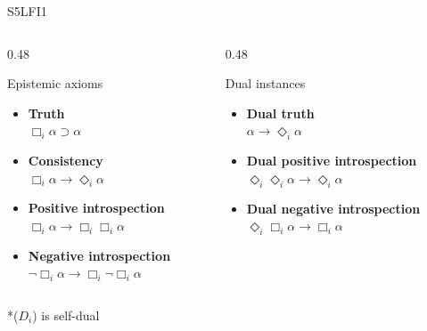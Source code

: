 \documentclass[aspectratio=169,11pt]{beamer}
\begin{document}
\begin{frame}{S5LFI1}
\vspace{-1.1cm}
\small\begin{columns}[T,onlytextwidth]

  \begin{column}{0.48\textwidth}
    \begin{block}{Epistemic axioms}
      \begin{itemize}
        \setlength{\itemsep}{0.8ex}

        \item[\(\mathbf{T}_i\)] \textbf{Truth}\\
          \(\Box_i\alpha \supset \alpha\)

        \item[\(\mathbf{D}_i\)] \textbf{Consistency}\\
          \(\Box_i\alpha \rightarrow \Diamond_i\alpha\)

        \item[\(\mathbf{4}_i\)] \textbf{Positive introspection}\\
          \(\Box_i\alpha \rightarrow \Box_i \Box_i\alpha\)

        \item[\(\mathbf{5}_i\)] \textbf{Negative introspection}\\
          \(\neg \Box_i\alpha \rightarrow \Box_i\neg \Box_i\alpha\)
      \end{itemize}
    \end{block}
  \end{column}

  \begin{column}{0.48\textwidth}
    \begin{block}{Dual instances}
      \begin{itemize}
        \setlength{\itemsep}{0.8ex}

        \item[\(\mathbf{T}'_i\)] \textbf{Dual truth}\\
          \(\alpha \rightarrow \Diamond_i\alpha\)

       
          

        \item[\(\mathbf{4}'_i\)] \textbf{Dual positive introspection}\\
          \(\Diamond_i\Diamond_i\alpha \rightarrow \Diamond_i\alpha\)

        \item[\(\mathbf{5}'_i\)] \textbf{Dual negative introspection}\\
          \(\Diamond_i\Box_i\alpha \rightarrow \Box_i\alpha\)
      \end{itemize}
    \end{block}
  \end{column}

\end{columns}

*($D_i$) is self-dual
\end{frame}
\end{document}
